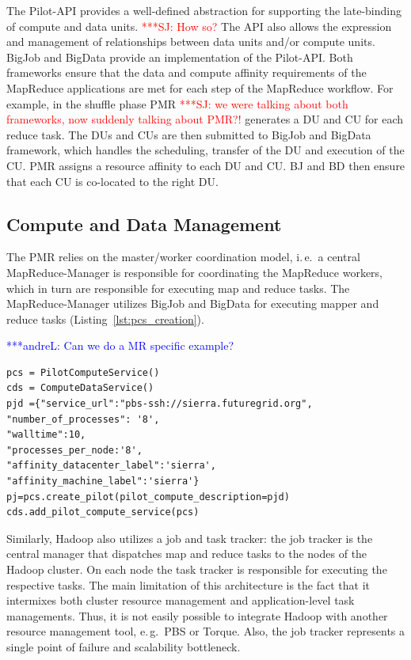 \documentclass{acm_proc_article-sp}
\newcommand{\jhanote}[1]{ {\textcolor{red} { ***SJ: #1 }}}
\newcommand{\alnote}[1]{ {\textcolor{blue} { ***andreL: #1 }}}
\newcommand{\alnote}[1]{}
\newcommand{\jhanote}[1]{}
\newcommand{\upp}{\vspace*{-0.5em}}
\begin{document}
The Pilot-API provides a well-defined abstraction for supporting the
late-binding of compute and data units. \jhanote{How so?} The API also
allows the expression and management of relationships between data
units and/or compute units. BigJob and BigData provide an
implementation of the Pilot-API. Both frameworks ensure that the data
and compute affinity requirements of the MapReduce applications are
met for each step of the MapReduce workflow. For example, in the
shuffle phase PMR \jhanote{we were talking about both frameworks, now
  suddenly talking about PMR?!} generates a DU and CU for each reduce
task. The DUs and CUs are then submitted to BigJob and BigData
framework, which handles the scheduling, transfer of the DU and
execution of the CU. PMR assigns a resource affinity to each DU and
CU.  BJ and BD then ensure that each CU is co-located to the right DU.

\upp
\subsection{Compute and Data Management}
The PMR relies on the master/worker coordination model, i.\,e.\ a
central MapReduce-Manager is responsible for coordinating the
MapReduce workers, which in turn are responsible for executing map and
reduce tasks. The MapReduce-Manager utilizes BigJob and BigData for executing
mapper and reduce tasks (Listing~\ref{lst:pcs_creation}).

\alnote{Can we do a MR specific example?}

\lstset{
language=Python,
frame=single,
captionpos=b,
stringstyle=\ttfamily,
basicstyle=\scriptsize\ttfamily
}
\noindent\begin{minipage}{0.47 \textwidth}
\begin{lstlisting}[caption={\textbf{Pilot Compute Creation:} Instantiation of a Pilot Job using Pilot Compute Description}, label={lst:pcs_creation}]
pcs = PilotComputeService()
cds = ComputeDataService()
pjd ={"service_url":"pbs-ssh://sierra.futuregrid.org", 
"number_of_processes": '8',
"walltime":10, 
"processes_per_node:'8',
"affinity_datacenter_label":'sierra',
"affinity_machine_label":'sierra'}
pj=pcs.create_pilot(pilot_compute_description=pjd)
cds.add_pilot_compute_service(pcs)
\end{lstlisting}
\end{minipage}

Similarly, Hadoop also utilizes a job and task tracker: the job
tracker is the central manager that dispatches map and reduce tasks to
the nodes of the Hadoop cluster. On each node the task tracker is
responsible for executing the respective tasks. The main limitation of
this architecture is the fact that it intermixes both cluster resource
management and application-level task managements. Thus, it is not
easily possible to integrate Hadoop with another resource management
tool, e.\,g.\ PBS or Torque. Also, the job tracker represents a single
point of failure and scalability bottleneck.
\end{document}
